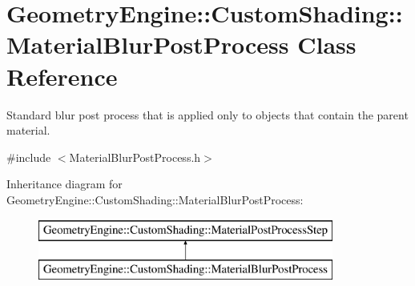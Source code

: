 \hypertarget{class_geometry_engine_1_1_custom_shading_1_1_material_blur_post_process}{}\section{Geometry\+Engine\+::Custom\+Shading\+::Material\+Blur\+Post\+Process Class Reference}
\label{class_geometry_engine_1_1_custom_shading_1_1_material_blur_post_process}


Standard blur post process that is applied only to objects that contain the parent material.  




{\ttfamily \#include $<$Material\+Blur\+Post\+Process.\+h$>$}

Inheritance diagram for Geometry\+Engine\+::Custom\+Shading\+::Material\+Blur\+Post\+Process\+:\begin{figure}[H]
\begin{center}
\leavevmode
\includegraphics[height=2.000000cm]{class_geometry_engine_1_1_custom_shading_1_1_material_blur_post_process}
\end{center}
\end{figure}
